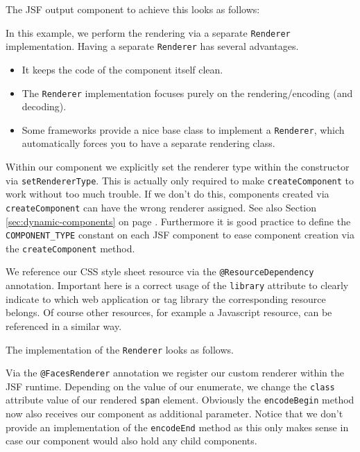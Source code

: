 The JSF output component to achieve this looks as follows:

In this example, we perform the rendering via a separate \texttt{Renderer} implementation.
Having a separate \texttt{Renderer} has several advantages.
\begin{itemize}
	\item It keeps the code of the component itself clean.
	\item The \texttt{Renderer} implementation focuses purely on the rendering/encoding (and decoding).
	\item Some frameworks provide a nice base class to implement a \texttt{Renderer}, which automatically forces you to have a separate rendering class.
\end{itemize}
Within our component we explicitly set the renderer type within the constructor via \texttt{setRendererType}.
This is actually only required to make \texttt{createComponent} to work without too much trouble.
If we don't do this, components created via \texttt{createComponent} can have the wrong renderer assigned.
See also Section \ref{sec:dynamic-components}  on page \pageref{sec:dynamic-components}.
Furthermore it is good practice to define the \texttt{COMPONENT\_TYPE} constant on each JSF component to ease component creation via the \texttt{createComponent} method.

We reference our CSS style sheet resource via the \texttt{@ResourceDependency} annotation.
Important here is a correct usage of the \texttt{library} attribute to clearly indicate to which web application or tag library the corresponding resource belongs.
Of course other resources, for example a Javascript resource, can be referenced in a similar way.

The implementation of the \texttt{Renderer} looks as follows.

Via the \texttt{@FacesRenderer} annotation we register our custom renderer within the JSF runtime.
Depending on the value of our enumerate, we change the \texttt{class} attribute value of our rendered \texttt{span} element.
Obviously the \texttt{encodeBegin} method now also receives our component as additional parameter.
Notice that we don't provide an implementation of the \texttt{encodeEnd} method as this only makes sense in case our component would also hold any child components.

